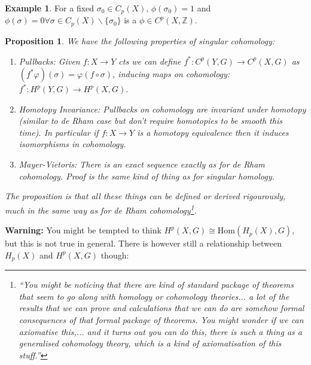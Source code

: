 \documentclass[10pt]{article}
\theoremstyle{plain}
\newtheorem{prop}[thm]{Proposition}
\theoremstyle{definition}
\newtheorem{exmp}[thm]{Example} %
\newcommand{\Hom}[2]{\text{Hom}\left(#1,#2\right)}
\begin{document}
\begin{exmp}
    For a fixed $\sigma_0 \in C_p(X),\,\phi(\sigma_0) = 1 $ and $\phi(\sigma)=0 \forall \sigma\in C_p(X)\backslash\{\sigma_0\}$ is a $\phi \in C^p(X,\mathbb{Z})$.
\end{exmp}

\begin{prop}
    We have the following properties of singular cohomology: 
    \begin{enumerate}
        \item Pullbacks: Given $f:X\to Y$ cts we can define $f^*:C^p(Y,G) \to C^p(X,G) $ as $(f^*\varphi)(\sigma) = \varphi(f\circ \sigma)$, inducing maps on cohomology: $f^*: H^p(Y,G) \to H^p(X,G)$.
        \item Homotopy Invariance: Pullbacks on cohomology are invariant under homotopy (similar to de Rham case but don't require homotopies to be smooth this time). In particular if $f:X\to Y$ is a homotopy equivalence then it induces isomorphisms in cohomology.
        \item Mayer-Vietoris: There is an exact sequence exactly as for de Rham cohomology. Proof is the same kind of thing as for singular homology.
    \end{enumerate}
    The proposition is that all these things can be defined or derived rigourously, much in the same way as for de Rham cohomology\footnote{``You might be noticing that there are kind of standard package of theorems that seem to go along with homology or cohomology theories... a lot of the results that we can prove and calculations that we can do are somehow formal consequences of that formal package of theorems. You might wonder if we can axiomatise this,... and it turns out you can do this, there is such a thing as a generalised cohomology theory, which is a kind of axiomatisation of this stuff.'' }.
\end{prop}
\noindent
\textbf{Warning:} You might be tempted to think $H^p(X,G) \cong \Hom{H_p(X)}{G}$, but this is not true in general. There is however still a relationship between $H_p(X) $ and $H^p(X,G)$ though:
\\
\end{document}
